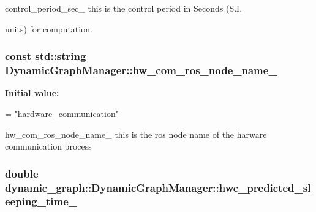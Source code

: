 control\+\_\+period\+\_\+sec\+\_\+ this is the control period in Seconds (S.\+I. 

units) for computation. 
\subsubsection[{\texorpdfstring{hw\+\_\+com\+\_\+ros\+\_\+node\+\_\+name\+\_\+}{hw_com_ros_node_name_}}]{\setlength{\rightskip}{0pt plus 5cm}const std\+::string Dynamic\+Graph\+Manager\+::hw\+\_\+com\+\_\+ros\+\_\+node\+\_\+name\+\_\+\hspace{0.3cm}{\ttfamily [static]}}\hypertarget{classdynamic__graph_1_1DynamicGraphManager_a415f24927dbe9dfd0ee4a6462428bd48}{}\label{classdynamic__graph_1_1DynamicGraphManager_a415f24927dbe9dfd0ee4a6462428bd48}
{\bfseries Initial value\+:}
\begin{DoxyCode}
=
    \textcolor{stringliteral}{"hardware\_communication"}
\end{DoxyCode}


hw\+\_\+com\+\_\+ros\+\_\+node\+\_\+name\+\_\+ this is the ros node name of the harware communication process 

\subsubsection[{\texorpdfstring{hwc\+\_\+predicted\+\_\+sleeping\+\_\+time\+\_\+}{hwc_predicted_sleeping_time_}}]{\setlength{\rightskip}{0pt plus 5cm}double dynamic\+\_\+graph\+::\+Dynamic\+Graph\+Manager\+::hwc\+\_\+predicted\+\_\+sleeping\+\_\+time\+\_\+\hspace{0.3cm}{\ttfamily [protected]}}\hypertarget{classdynamic__graph_1_1DynamicGraphManager_af5aa11023c1dd272d7bbabdcccc511b6}{}\label{classdynamic__graph_1_1DynamicGraphManager_af5aa11023c1dd272d7bbabdcccc511b6}



